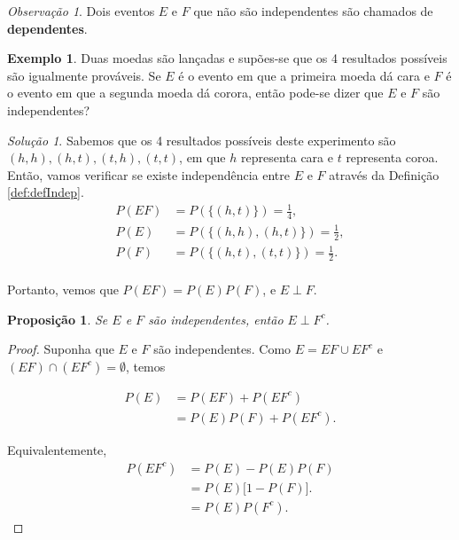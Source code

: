 \documentclass[]{book}
\newtheorem{proposition}{Proposição}[chapter]
\theoremstyle{definition}
\theoremstyle{definition}
\newtheorem{example}{Exemplo}[chapter]
\theoremstyle{definition}
\theoremstyle{remark}
\newtheorem*{remark}{Observação}
\newtheorem*{solution}{Solução}
\begin{document}
\begin{remark}
\iffalse{} {Observação. } \fi{}Dois eventos \(E\) e \(F\) que não são independentes são chamados de \textbf{dependentes}.
\end{remark}

\begin{example}
\protect\hypertarget{exm:unnamed-chunk-161}{}{\label{exm:unnamed-chunk-161} }Duas moedas são lançadas e supões-se que os 4 resultados possíveis são igualmente prováveis.
Se \(E\) é o evento em que a primeira moeda dá cara e \(F\) é o evento em que a segunda moeda dá corora, então pode-se dizer que \(E\) e \(F\) são independentes?
\end{example}

\begin{solution}
\iffalse{} {Solução. } \fi{}Sabemos que os 4 resultados possíveis deste experimento são \((h,h),(h,t),(t,h),(t,t)\), em que \(h\) representa cara e \(t\) representa coroa.
Então, vamos verificar se existe independência entre \(E\) e \(F\) através da Definição \ref{def:defIndep}.
\begin{align}
P(EF) &= P(\{(h,t)\}) = \frac{1}{4},\\
P(E) &= P(\{(h,h),(h,t)\}) = \frac{1}{2},\\
P(F) &= P(\{(h,t),(t,t)\}) = \frac{1}{2}.\\
\end{align}

Portanto, vemos que \(P(EF) = P(E)P(F)\), e \(E \perp F\).
\end{solution}

\begin{proposition}
\protect\hypertarget{prp:unnamed-chunk-163}{}{\label{prp:unnamed-chunk-163} }Se \(E\) e \(F\) são independentes, então \(E\perp F^c\).
\end{proposition}

\begin{proof}
\iffalse{} {Prova. } \fi{}Suponha que \(E\) e \(F\) são independentes.
Como \(E=EF\cup EF^c\) e \((EF)\cap (EF^c)=\emptyset\), temos

\begin{align}
P(E) &= P(EF) + P(EF^c)\\
&=P(E)P(F) + P(EF^c).
\end{align}

Equivalentemente,
\begin{align}
P(EF^c) &= P(E) - P(E)P(F)\\
&=P(E)\big[1-P(F)\big].\\
&=P(E)P(F^c).
\end{align}
\end{proof}
\end{document}
